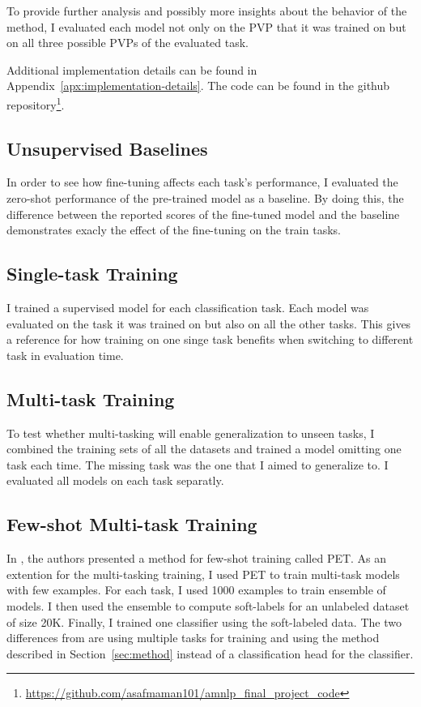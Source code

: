 \documentclass[11pt,a4paper]{article}
\begin{document}
To provide further analysis and possibly more insights about the behavior of the method, I evaluated each model not only on the PVP that it was trained on but on all three possible PVPs of the evaluated task.

Additional implementation details can be found in Appendix~\ref{apx:implementation-details}.
The code can be found in the github repository\footnote{\url{https://github.com/asafmaman101/amnlp_final_project_code}}.

\subsection*{Unsupervised Baselines}
In order to see how fine-tuning affects each task's performance, I evaluated the zero-shot performance of the pre-trained model as a baseline.
By doing this, the difference between the reported scores of the fine-tuned model and the baseline demonstrates exacly the effect of the fine-tuning on the train tasks.

\subsection*{Single-task Training}
I trained a supervised model for each classification task.
Each model was evaluated on the task it was trained on but also on all the other tasks.
This gives a reference for how training on one singe task benefits when switching to different task in evaluation time.

\subsection*{Multi-task Training}
To test whether multi-tasking will enable generalization to unseen tasks, I combined the training sets of all the datasets and trained a model omitting one task each time.
The missing task was the one that I aimed to generalize to.
I evaluated all models on each task separatly.

\subsection*{Few-shot Multi-task Training}
In \citet{schick2020exploiting}, the authors presented a method for few-shot training called PET.
As an extention for the multi-tasking training, I used PET to train multi-task models with few examples.
For each task, I used 1000 examples to train ensemble of models.
I then used the ensemble to compute soft-labels for an unlabeled dataset of size 20K.
Finally, I trained one classifier using the soft-labeled data.
The two differences from \citet{schick2020exploiting} are using multiple tasks for training and using the method described in Section~\ref{sec:method} instead of a classification head for the classifier.
\end{document}
